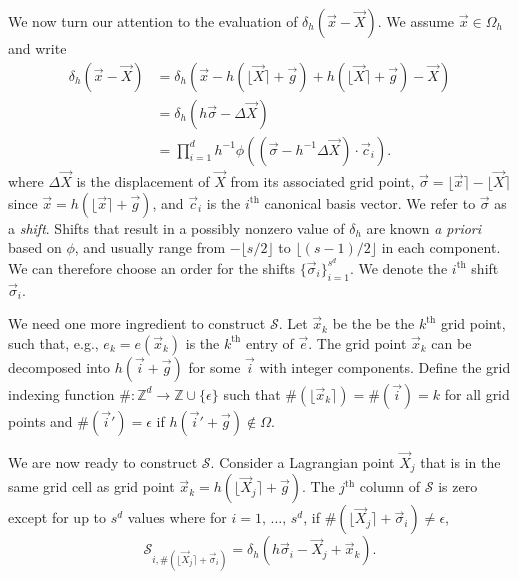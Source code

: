 We now turn our attention to the evaluation of $\delta_h(\vec{x}-\vec{X})$. We
assume $\vec{x}\in\Omega_h$ and write
\begin{equation}
    \label{eq:delta-defs}
    \begin{aligned}
        \delta_h(\vec{x}-\vec{X})
        &= \delta_h(\vec{x}-h(\lfloor\vec{X}\rceil+\vec{g}) + h(\lfloor\vec{X}\rceil+\vec{g}) - \vec{X}) \\
        &= \delta_h(h\vec{\sigma} - \Delta\vec{X}) \\
        &= \prod_{i=1}^d h^{-1}\phi((\vec{\sigma} - h^{-1}\Delta\vec{X})\cdot\vec{c}_i).
    \end{aligned}
\end{equation}
where $\Delta\vec{X}$ is the displacement of $\vec{X}$ from its associated grid
point, $\vec{\sigma} = \lfloor\vec{x}\rceil-\lfloor\vec{X}\rceil$ since
$\vec{x} = h(\lfloor\vec{x}\rceil+\vec{g})$, and $\vec{c}_i$ is the $i^\text{th}$
canonical basis vector. We refer to $\vec{\sigma}$ as a \emph{shift}. Shifts
that result in a possibly nonzero value of $\delta_h$ are known \emph{a priori}
based on $\phi$, and usually range from $-\lfloor s/2\rfloor$ to
$\lfloor(s-1)/2\rfloor$ in each component. We can therefore choose an order for
the shifts $\{\vec{\sigma}_i\}_{i=1}^{s^d}$. We denote the $i^\text{th}$ shift
$\vec{\sigma}_i$.

We need one more ingredient to construct $\mathcal{S}$. Let $\vec{x}_k$ be the
be the $k^\text{th}$ grid point, such that, e.g., $e_k = e(\vec{x}_k)$ is the $k^\text{th}$
entry of $\vec{e}$. The grid point $\vec{x}_k$ can be decomposed into
$h(\vec{i}+\vec{g})$ for some $\vec{i}$ with integer components. Define the
grid indexing function $\#:\mathbb{Z}^d\to\mathbb{Z}\cup\{\epsilon\}$ such that
$\#(\lfloor\vec{x}_k\rceil) = \#(\vec{i}) = k$ for all grid points and
$\#(\vec{i}')=\epsilon$ if $h(\vec{i}'+\vec{g}) \not\in \Omega$.

We are now ready to construct $\mathcal{S}$. Consider a Lagrangian point
$\vec{X}_j$ that is in the same grid cell as grid point
$\vec{x}_k=h(\lfloor\vec{X}_j\rceil+\vec{g})$. The $j^\text{th}$ column of
$\mathcal{S}$ is zero except for up to $s^d$ values where for
$i=1,\,\ldots,\,s^d$, if $\#(\lfloor\vec{X}_j\rceil+\vec{\sigma}_i)\neq\epsilon$,
\begin{equation}
    \label{eq:s-columnwise}
    \mathcal{S}_{i,\#(\lfloor\vec{X}_j\rceil + \vec{\sigma}_i)} = \delta_h(h\vec{\sigma}_i-\vec{X}_j+\vec{x}_k).
\end{equation}

